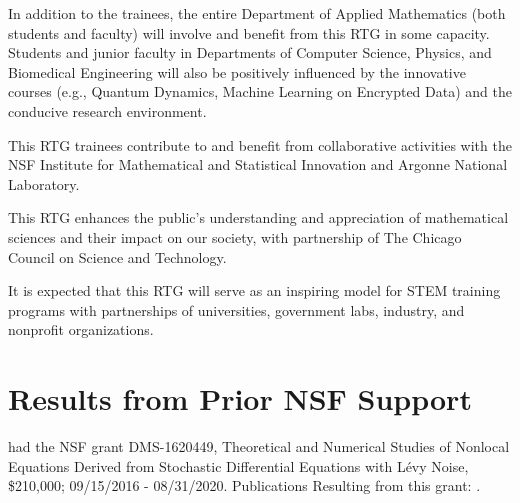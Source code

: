 \documentclass[11pt]{NSFamsart}
\begin{document}
In addition to the   trainees, the entire Department of Applied Mathematics (both students and faculty) will   involve and benefit from this RTG in some capacity.    Students and junior faculty in Departments of Computer Science, Physics, and Biomedical Engineering will also be positively influenced by the innovative courses (e.g., Quantum Dynamics, Machine Learning on Encrypted Data) and the conducive research environment. 
 
This RTG trainees contribute to and benefit from collaborative activities with the NSF Institute for Mathematical and Statistical Innovation  and Argonne National Laboratory. 

This RTG enhances the public’s understanding and appreciation of mathematical sciences     and their impact on our society, with partnership of The Chicago Council on Science and Technology. 
 
It is expected that this RTG will serve as an inspiring model for STEM  training programs with partnerships of universities, government labs, industry, and nonprofit organizations.

 
\section{Results from Prior NSF Support}

 
  
 
 had the   NSF grant  DMS-1620449, Theoretical and Numerical Studies of Nonlocal Equations Derived from Stochastic Differential Equations with L\'evy Noise, \$210,000; 09/15/2016 - 08/31/2020. Publications Resulting from this grant:
 \cite{ChenWu, ChenXL2020,  DannyTesfay,GaoTing2016, Gao2016,    Liu2019LvyNI, Lv2016OnAS, QiaoDuan2018,Wang2018NumericalAF, YangDuanWiggins2020,ZhangZhuanDuan,ZhengDuan2017,ZhengYY2020}.
\end{document}
